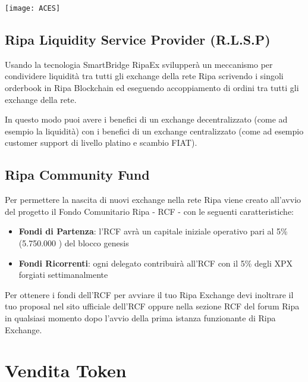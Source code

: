 \documentclass[11pt,fleqn]{book} %
\begin{document}
\begin{center}
	\texttt{[image: ACES]}
\end{center}

\section{Ripa Liquidity Service Provider (R.L.S.P)}
Usando la tecnologia SmartBridge RipaEx svilupperà un meccanismo per condividere liquidità tra tutti gli exchange della rete
Ripa scrivendo i singoli orderbook in Ripa Blockchain ed eseguendo accoppiamento di ordini tra tutti gli exchange della rete.

In questo modo puoi avere i benefici di un exchange decentralizzato (come ad esempio la liquidità) con i benefici di un 
exchange centralizzato (come ad esempio customer support di livello platino e scambio FIAT).

\section{Ripa Community Fund}
Per permettere la nascita di nuovi exchange nella rete Ripa viene creato all'avvio del progetto il Fondo Comunitario Ripa - RCF - 
con le seguenti caratteristiche:
\begin{itemize}
	\item \textbf{Fondi di Partenza}: l'RCF avrà un capitale iniziale operativo pari al 5\% (5.750.000 \PHP) del blocco genesis
	\item \textbf{Fondi Ricorrenti}: ogni delegato contribuirà all'RCF con il 5\% degli XPX forgiati settimanalmente
\end{itemize}
\vspace{5mm}
Per ottenere i fondi dell'RCF per avviare il tuo Ripa Exchange devi inoltrare il tuo proposal nel sito ufficiale dell'RCF oppure
nella sezione RCF del forum Ripa in qualsiasi momento dopo l'avvio della prima istanza funzionante di Ripa Exchange.


\chapter{Vendita Token}
\end{document}
